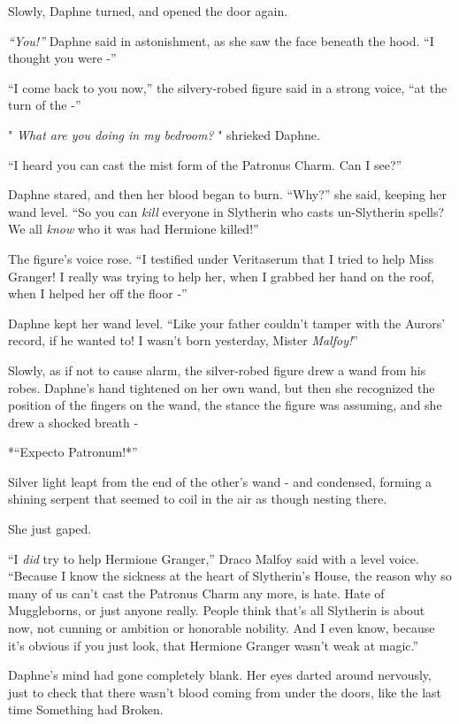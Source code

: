 Slowly, Daphne turned, and opened the door again.

\emph{``You!''} Daphne said in astonishment, as she saw the face beneath
the hood. ``I thought you were -''

``I come back to you now,'' the silvery-robed figure said in a strong
voice, ``at the turn of the -''

" \emph{What are you doing in my bedroom?} " shrieked Daphne.

``I heard you can cast the mist form of the Patronus Charm. Can I see?''

Daphne stared, and then her blood began to burn. ``Why?'' she said,
keeping her wand level. ``So you can \emph{kill} everyone in Slytherin
who casts un-Slytherin spells? We all \emph{know} who it was had
Hermione killed!''

The figure's voice rose. ``I testified under Veritaserum that I tried to
help Miss Granger! I really was trying to help her, when I grabbed her
hand on the roof, when I helped her off the floor -''

Daphne kept her wand level. ``Like your father couldn't tamper with the
Aurors' record, if he wanted to! I wasn't born yesterday, Mister
\emph{Malfoy!}''

Slowly, as if not to cause alarm, the silver-robed figure drew a wand
from his robes. Daphne's hand tightened on her own wand, but then she
recognized the position of the fingers on the wand, the stance the
figure was assuming, and she drew a shocked breath -

*``Expecto Patronum!*''

Silver light leapt from the end of the other's wand - and condensed,
forming a shining serpent that seemed to coil in the air as though
nesting there.

She just gaped.

``I \emph{did} try to help Hermione Granger,'' Draco Malfoy said with a
level voice. ``Because I know the sickness at the heart of Slytherin's
House, the reason why so many of us can't cast the Patronus Charm any
more, is hate. Hate of Muggleborns, or just anyone really. People think
that's all Slytherin is about now, not cunning or ambition or honorable
nobility. And I even know, because it's obvious if you just look, that
Hermione Granger wasn't weak at magic.''

Daphne's mind had gone completely blank. Her eyes darted around
nervously, just to check that there wasn't blood coming from under the
doors, like the last time Something had Broken.

